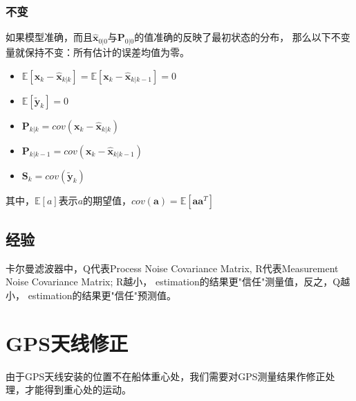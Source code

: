 \subsubsection{不变}
如果模型准确，而且$\hat{\bm{x}}_{0|0}$与$\bm{P}_{0|0}$的值准确的反映了最初状态的分布，
那么以下不变量就保持不变：所有估计的误差均值为零。
\begin{itemize}
  \item $\mathbb{E}[\bm{x}_k - \hat{\bm{x}}_{k|k}] =
      \mathbb{E}[\bm{x}_k - \hat{\bm{x}}_{k|k-1}] = 0$
  \item  $\mathbb{E}[\tilde{\bm{y}}_k]=0$
  \item $\bm{P}_{k|k}= cov(\bm{x}_k - \hat{\bm{x}}_{k|k})$
  \item $\bm{P}_{k|k-1}= cov(\bm{x}_k - \hat{\bm{x}}_{k|k-1})$
  \item $\bm{S}_k = cov(\tilde{\bm{y}}_k)$
\end{itemize}
其中，$\mathbb{E}[a]$表示$a$的期望值，$cov(\bm{a})=\mathbb{E}[\bm{a} \bm{a}^T]$

\subsection{经验}
卡尔曼滤波器中，Q代表Process Noise Covariance Matrix, R代表Measurement Noise
Covariance Matrix; R越小， estimation的结果更"信任"测量值，反之，Q越小，
estimation的结果更"信任"预测值。


\section{GPS天线修正}
由于GPS天线安装的位置不在船体重心处，我们需要对GPS测量结果作修正处理，才能得到重心处的运动。
